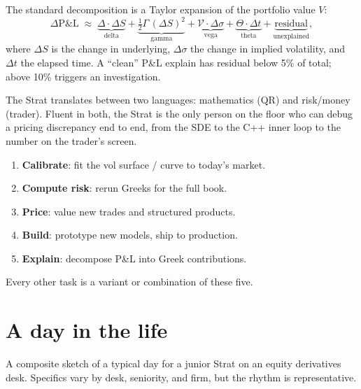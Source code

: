 The standard decomposition is a Taylor expansion of the portfolio
value $V$:
\begin{equation}
  \Delta\text{P\&L}
  \;\approx\;
  \underbrace{\Delta \cdot \Delta S}_{\text{delta}}
  + \underbrace{\tfrac{1}{2}\Gamma\,(\Delta S)^2}_{\text{gamma}}
  + \underbrace{\mathcal{V}\cdot\Delta\sigma}_{\text{vega}}
  + \underbrace{\Theta\cdot\Delta t}_{\text{theta}}
  + \underbrace{\text{residual}}_{\text{unexplained}},
  \label{eq:strats_pnl_explain}
\end{equation}
where $\Delta S$ is the change in underlying, $\Delta\sigma$ the
change in implied volatility, and $\Delta t$ the elapsed time.  A
``clean'' P\&L explain has residual below 5\% of total; above 10\%
triggers an investigation.

\begin{intuitionbox}
The Strat translates between two languages: mathematics (QR) and
risk/money (trader).  Fluent in both, the Strat is the only person
on the floor who can debug a pricing discrepancy end to end, from
the SDE to the C++ inner loop to the number on the trader's screen.
\end{intuitionbox}

\begin{keyfactbox}
\begin{enumerate}
  \item \textbf{Calibrate}: fit the vol surface / curve to today's market.
  \item \textbf{Compute risk}: rerun Greeks for the full book.
  \item \textbf{Price}: value new trades and structured products.
  \item \textbf{Build}: prototype new models, ship to production.
  \item \textbf{Explain}: decompose P\&L into Greek contributions.
\end{enumerate}
Every other task is a variant or combination of these five.
\end{keyfactbox}

\section{A day in the life}
\label{sec:strats_day_in_life}

A composite sketch of a typical day for a junior Strat on an equity
derivatives desk.  Specifics vary by desk, seniority, and firm, but
the rhythm is representative.

